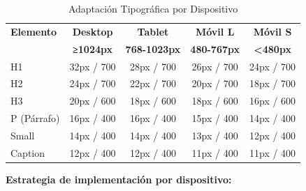\documentclass[12pt,a4paper,oneside]{article}
\begin{document}
\begin{table}[h]
\centering
\caption{Adaptación Tipográfica por Dispositivo}
\label{tab:responsividad}
\small
\begin{tabular}{|l|c|c|c|c|}
\hline
\textbf{Elemento} & \textbf{Desktop} & \textbf{Tablet} & \textbf{Móvil L} & \textbf{Móvil S} \\
 & \textbf{≥1024px} & \textbf{768-1023px} & \textbf{480-767px} & \textbf{<480px} \\
\hline
H1 & 32px / 700 & 28px / 700 & 26px / 700 & 24px / 700 \\
\hline
H2 & 24px / 700 & 22px / 700 & 20px / 700 & 18px / 700 \\
\hline
H3 & 20px / 600 & 18px / 600 & 18px / 600 & 16px / 600 \\
\hline
P (Párrafo) & 16px / 400 & 16px / 400 & 15px / 400 & 14px / 400 \\
\hline
Small & 14px / 400 & 14px / 400 & 13px / 400 & 12px / 400 \\
\hline
Caption & 12px / 400 & 12px / 400 & 11px / 400 & 11px / 400 \\
\hline
\end{tabular}
\end{table}

\textbf{Estrategia de implementación por dispositivo:}
\end{document}
